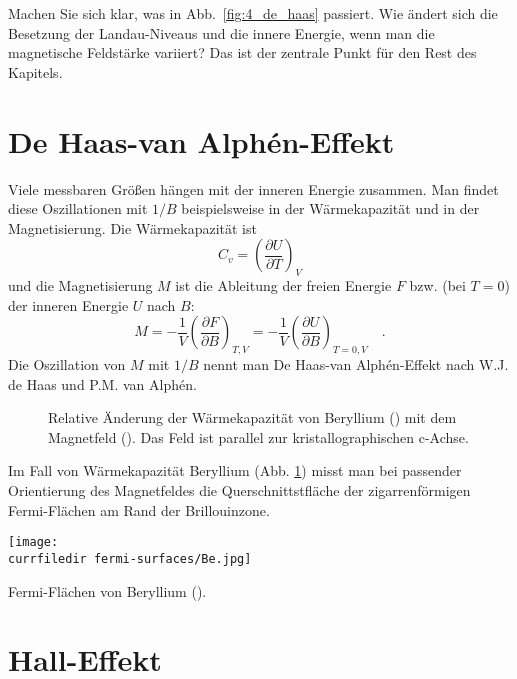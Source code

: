 \begin{questions}
   \item Machen Sie sich klar, was in Abb.~\ref{fig:4_de_haas} passiert. Wie ändert sich die Besetzung der Landau-Niveaus und die innere Energie, wenn man die magnetische Feldstärke variiert? Das ist der zentrale Punkt für den Rest des Kapitels.
\end{questions}

\section{De Haas-van Alphén-Effekt}

Viele messbaren Größen hängen mit der  inneren Energie zusammen. Man findet diese Oszillationen mit $1/B$ beispielsweise in der Wärmekapazität  und in der Magnetisierung. Die Wärmekapazität ist
\begin{equation}
   C_v =  \left(\frac{\partial U}{ \partial T} \right)_{V} 
\end{equation}
und die Magnetisierung $M$ ist die Ableitung der freien Energie $F$ bzw. (bei $T=0$) der inneren Energie $U$ nach $B$:
\begin{equation}
   M = - \frac{1}{V} \left(\frac{\partial F}{ \partial B} \right)_{T,V} 
     = - \frac{1}{V} \left(\frac{\partial U}{ \partial B} \right)_{T=0,V} \quad .
\end{equation}
Die Oszillation von $M$ mit $1/B$ nennt man De Haas-van Alphén-Effekt nach W.J. de Haas und P.M. van Alphén.

\begin{figure}
   \caption{Relative Änderung der Wärmekapazität von Beryllium () mit dem Magnetfeld (\cite{Sullivan68_beryllium}). Das Feld ist parallel zur kristallographischen c-Achse. \label{fig:4_beryllium}}
\end{figure}

Im Fall von Wärmekapazität Beryllium (Abb. \ref{fig:4_beryllium}) misst man bei passender Orientierung des Magnetfeldes die Querschnittstfläche der zigarrenförmigen Fermi-Flächen am Rand der Brillouinzone. 

\begin{marginfigure}
   \texttt{[image: \\currfiledir fermi-surfaces/Be.jpg]}
   \caption{Fermi-Flächen von  Beryllium (\cite{Choy00_fermi_surfaces}).}
\end{marginfigure}



\section{Hall-Effekt}

